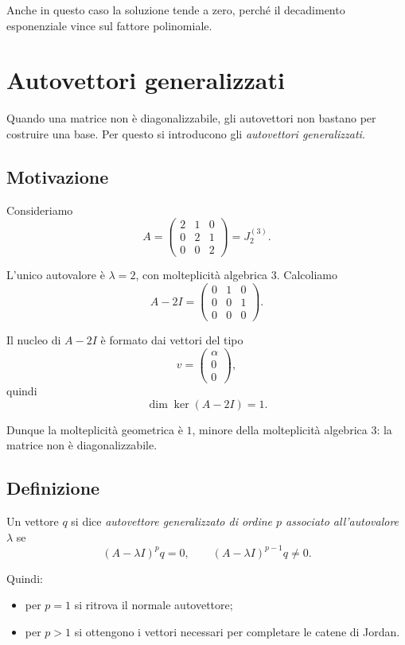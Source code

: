 Anche in questo caso la soluzione tende a zero, perché il decadimento esponenziale vince sul fattore polinomiale.

\section{Autovettori generalizzati}

Quando una matrice non è diagonalizzabile, gli autovettori non bastano per costruire una base.  
Per questo si introducono gli \emph{autovettori generalizzati}.

\subsection{Motivazione}

Consideriamo
\[
A=
\begin{pmatrix}
2 & 1 & 0\\
0 & 2 & 1\\
0 & 0 & 2
\end{pmatrix}
=
J_2^{(3)}.
\]

L'unico autovalore è $\lambda=2$, con molteplicità algebrica $3$.  
Calcoliamo
\[
A-2I=
\begin{pmatrix}
0 & 1 & 0\\
0 & 0 & 1\\
0 & 0 & 0
\end{pmatrix}.
\]

Il nucleo di $A-2I$ è formato dai vettori del tipo
\[
v=
\begin{pmatrix}
\alpha\\
0\\
0
\end{pmatrix},
\]
quindi
\[
\dim \ker(A-2I)=1.
\]

Dunque la molteplicità geometrica è $1$, minore della molteplicità algebrica $3$: la matrice non è diagonalizzabile.

\subsection{Definizione}

Un vettore $q$ si dice \emph{autovettore generalizzato di ordine $p$ associato all'autovalore $\lambda$} se
\begin{equation}
(A-\lambda I)^p q=0,
\qquad
(A-\lambda I)^{p-1}q\neq 0.
\label{eq:L6_generalized_eigenvector_def}
\end{equation}

Quindi:
\begin{itemize}
    \item per $p=1$ si ritrova il normale autovettore;
    \item per $p>1$ si ottengono i vettori necessari per completare le catene di Jordan.
\end{itemize}

